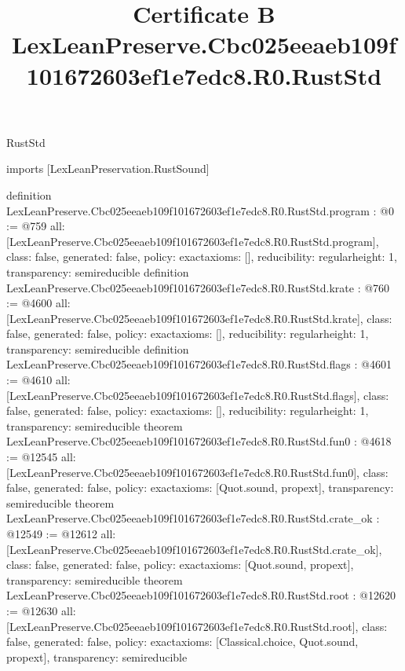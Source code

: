\begin{lexlean}{RustStd}
\title{Certificate B LexLeanPreserve.Cbc025eeaeb109f101672603ef1e7edc8.R0.RustStd}
\begin{coremodule}
imports [LexLeanPreservation.RustSound]

definition LexLeanPreserve.Cbc025eeaeb109f101672603ef1e7edc8.R0.RustStd.program : @0 := @759 {
  all: [LexLeanPreserve.Cbc025eeaeb109f101672603ef1e7edc8.R0.RustStd.program],
  class: false,
  generated: false,
  policy: exact{axioms: []},
  reducibility: regular{height: 1},
  transparency: semireducible
}
definition LexLeanPreserve.Cbc025eeaeb109f101672603ef1e7edc8.R0.RustStd.krate : @760 := @4600 {
  all: [LexLeanPreserve.Cbc025eeaeb109f101672603ef1e7edc8.R0.RustStd.krate],
  class: false,
  generated: false,
  policy: exact{axioms: []},
  reducibility: regular{height: 1},
  transparency: semireducible
}
definition LexLeanPreserve.Cbc025eeaeb109f101672603ef1e7edc8.R0.RustStd.flags : @4601 := @4610 {
  all: [LexLeanPreserve.Cbc025eeaeb109f101672603ef1e7edc8.R0.RustStd.flags],
  class: false,
  generated: false,
  policy: exact{axioms: []},
  reducibility: regular{height: 1},
  transparency: semireducible
}
theorem LexLeanPreserve.Cbc025eeaeb109f101672603ef1e7edc8.R0.RustStd.fun0 : @4618 := @12545 {
  all: [LexLeanPreserve.Cbc025eeaeb109f101672603ef1e7edc8.R0.RustStd.fun0],
  class: false,
  generated: false,
  policy: exact{axioms: [Quot.sound, propext]},
  transparency: semireducible
}
theorem LexLeanPreserve.Cbc025eeaeb109f101672603ef1e7edc8.R0.RustStd.crate_ok : @12549 := @12612 {
  all: [LexLeanPreserve.Cbc025eeaeb109f101672603ef1e7edc8.R0.RustStd.crate_ok],
  class: false,
  generated: false,
  policy: exact{axioms: [Quot.sound, propext]},
  transparency: semireducible
}
theorem LexLeanPreserve.Cbc025eeaeb109f101672603ef1e7edc8.R0.RustStd.root : @12620 := @12630 {
  all: [LexLeanPreserve.Cbc025eeaeb109f101672603ef1e7edc8.R0.RustStd.root],
  class: false,
  generated: false,
  policy: exact{axioms: [Classical.choice, Quot.sound, propext]},
  transparency: semireducible
}


\end{coremodule}
\end{lexlean}
